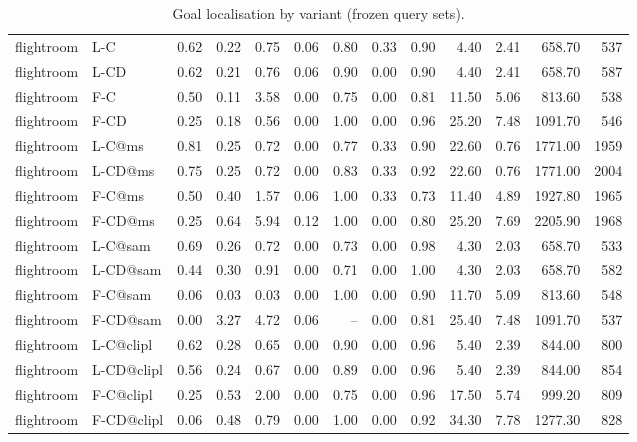 \begin{table}[ht]
\begin{tabular}{@{}llrrrrrrrrrrr@{}}
\midrule
flightroom & L-C & 0.62 & 0.22 & 0.75 & 0.06 & 0.80 & 0.33 & 0.90 & 4.40 & 2.41 & 658.70 & 537 \\
flightroom & L-CD & 0.62 & 0.21 & 0.76 & 0.06 & 0.90 & 0.00 & 0.90 & 4.40 & 2.41 & 658.70 & 587 \\
flightroom & F-C & 0.50 & 0.11 & 3.58 & 0.00 & 0.75 & 0.00 & 0.81 & 11.50 & 5.06 & 813.60 & 538 \\
flightroom & F-CD & 0.25 & 0.18 & 0.56 & 0.00 & 1.00 & 0.00 & 0.96 & 25.20 & 7.48 & 1091.70 & 546 \\
flightroom & L-C@ms & 0.81 & 0.25 & 0.72 & 0.00 & 0.77 & 0.33 & 0.90 & 22.60 & 0.76 & 1771.00 & 1959 \\
flightroom & L-CD@ms & 0.75 & 0.25 & 0.72 & 0.00 & 0.83 & 0.33 & 0.92 & 22.60 & 0.76 & 1771.00 & 2004 \\
flightroom & F-C@ms & 0.50 & 0.40 & 1.57 & 0.06 & 1.00 & 0.33 & 0.73 & 11.40 & 4.89 & 1927.80 & 1965 \\
flightroom & F-CD@ms & 0.25 & 0.64 & 5.94 & 0.12 & 1.00 & 0.00 & 0.80 & 25.20 & 7.69 & 2205.90 & 1968 \\
flightroom & L-C@sam & 0.69 & 0.26 & 0.72 & 0.00 & 0.73 & 0.00 & 0.98 & 4.30 & 2.03 & 658.70 & 533 \\
flightroom & L-CD@sam & 0.44 & 0.30 & 0.91 & 0.00 & 0.71 & 0.00 & 1.00 & 4.30 & 2.03 & 658.70 & 582 \\
flightroom & F-C@sam & 0.06 & 0.03 & 0.03 & 0.00 & 1.00 & 0.00 & 0.90 & 11.70 & 5.09 & 813.60 & 548 \\
flightroom & F-CD@sam & 0.00 & 3.27 & 4.72 & 0.06 & -- & 0.00 & 0.81 & 25.40 & 7.48 & 1091.70 & 537 \\
flightroom & L-C@clipl & 0.62 & 0.28 & 0.65 & 0.00 & 0.90 & 0.00 & 0.96 & 5.40 & 2.39 & 844.00 & 800 \\
flightroom & L-CD@clipl & 0.56 & 0.24 & 0.67 & 0.00 & 0.89 & 0.00 & 0.96 & 5.40 & 2.39 & 844.00 & 854 \\
flightroom & F-C@clipl & 0.25 & 0.53 & 2.00 & 0.00 & 0.75 & 0.00 & 0.96 & 17.50 & 5.74 & 999.20 & 809 \\
flightroom & F-CD@clipl & 0.06 & 0.48 & 0.79 & 0.00 & 1.00 & 0.00 & 0.92 & 34.30 & 7.78 & 1277.30 & 828 \\
\bottomrule
\end{tabular}
\caption{Goal localisation by variant (frozen query sets).}
\label{tab:sem-variants}
\end{table}
